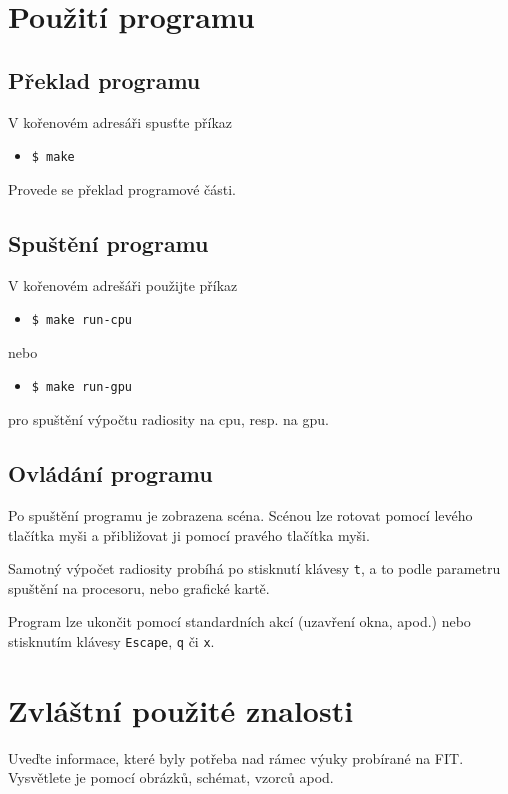 \documentclass[11pt,a4paper]{article}
\begin{document}
\section{Použití programu}

\subsection{Překlad programu}
V kořenovém adresáři spusťte příkaz
\begin{itemize}
  \item[] \texttt{\$ make}
\end{itemize}
Provede se překlad programové části.


\subsection{Spuštění programu}
V kořenovém adrešáři použijte příkaz
\begin{itemize}
  \item[] \texttt{\$ make run-cpu}
\end{itemize}
nebo
\begin{itemize}
  \item[] \texttt{\$ make run-gpu}
\end{itemize}
pro spuštění výpočtu radiosity na cpu, resp. na gpu.


\subsection{Ovládání programu}
Po spuštění programu je zobrazena scéna. Scénou lze rotovat pomocí levého tlačítka myši a přibližovat ji pomocí pravého tlačítka myši.

Samotný výpočet radiosity probíhá po stisknutí klávesy \texttt{t}, a to podle parametru spuštění na procesoru, nebo grafické kartě.

Program lze ukončit pomocí standardních akcí (uzavření okna, apod.) nebo stisknutím klávesy \texttt{Escape}, \texttt{q} či \texttt{x}.


\section{Zvláštní použité znalosti}

Uveďte informace, které byly potřeba nad rámec výuky probírané na FIT.
Vysvětlete je pomocí obrázků, schémat, vzorců apod. 
\end{document}

